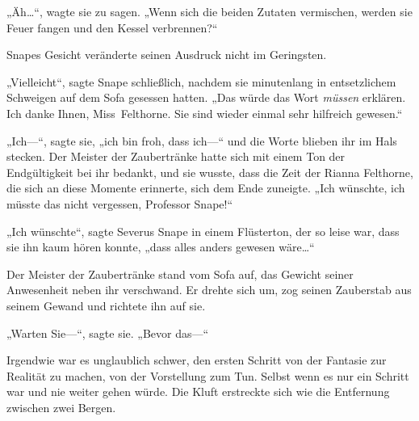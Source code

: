 „Äh…“, wagte sie zu sagen. „Wenn sich die beiden Zutaten vermischen, werden sie Feuer fangen und den Kessel verbrennen?“

Snapes Gesicht veränderte seinen Ausdruck nicht im Geringsten.

„Vielleicht“, sagte Snape schließlich, nachdem sie minutenlang in entsetzlichem Schweigen auf dem Sofa gesessen hatten. „Das würde das Wort \emph{müssen} erklären. Ich danke Ihnen, Miss~Felthorne. Sie sind wieder einmal sehr hilfreich gewesen.“

„Ich—“, sagte sie, „ich bin froh, dass ich—“ und die Worte blieben ihr im Hals stecken. Der Meister der Zaubertränke hatte sich mit einem Ton der Endgültigkeit bei ihr bedankt, und sie wusste, dass die Zeit der Rianna Felthorne, die sich an diese Momente erinnerte, sich dem Ende zuneigte. „Ich wünschte, ich müsste das nicht vergessen, Professor Snape!“

„Ich wünschte“, sagte Severus Snape in einem Flüsterton, der so leise war, dass sie ihn kaum hören konnte, „dass alles anders gewesen wäre…“

Der Meister der Zaubertränke stand vom Sofa auf, das Gewicht seiner Anwesenheit neben ihr verschwand. Er drehte sich um, zog seinen Zauberstab aus seinem Gewand und richtete ihn auf sie.

„Warten Sie—“, sagte sie. „Bevor das—“

Irgendwie war es unglaublich schwer, den ersten Schritt von der Fantasie zur Realität zu machen, von der Vorstellung zum Tun. Selbst wenn es nur ein Schritt war und nie weiter gehen würde. Die Kluft erstreckte sich wie die Entfernung zwischen zwei Bergen.

